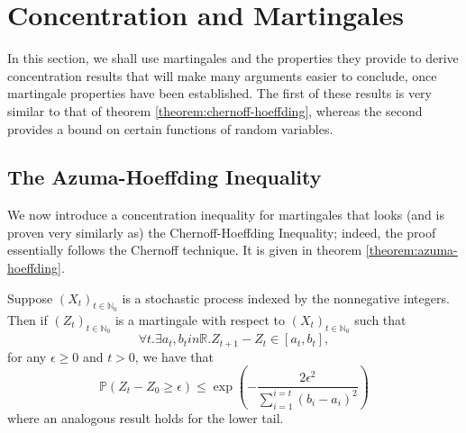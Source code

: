 \section{Concentration and Martingales}
	In this section, we shall use martingales and the properties they provide  to derive 
	concentration results that will make many arguments easier to conclude, once martingale 
	properties have been established. The first of these results is very similar to that of 
	theorem \ref{theorem:chernoff-hoeffding}, whereas the second provides a bound on certain 
	functions of random variables. 

	\subsection{The Azuma-Hoeffding Inequality}
	We now introduce a concentration inequality for martingales that looks (and is proven very 
	similarly as) the Chernoff-Hoeffding Inequality; indeed, the proof essentially follows the 
	Chernoff technique. It is given in theorem \ref{theorem:azuma-hoeffding}.
	\begin{theorem}
		\label{theorem:azuma:hoeffding}
		Suppose $(X_t)_{t \in \mathbb{N}_0}$ is a stochastic process indexed by the 
		nonnegative integers. Then if $(Z_t)_{t\in\mathbb{N}_0}$ is a martingale with 
		respect to $(X_t)_{t\in\mathbb{N}_0}$ such that 
		$$
			\forall t . \exists a_t, b_t in \mathbb{R}. Z_{t+1} - Z_t \in [a_t, b_t],
		$$
		for any $\epsilon \geq 0$ and $t > 0$, we have that 
		$$
			\mathbb{P}(Z_t-Z_0 \geq \epsilon) \leq \exp\left(- \frac{2\epsilon^2}{
			\sum_{i=1}^{i=t}(b_i-a_i)^2}\right)
		$$
		where an analogous result holds for the lower tail.
	\end{theorem}
